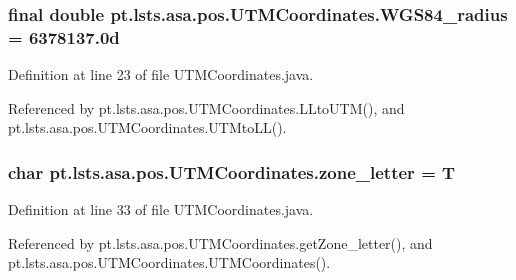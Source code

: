 \hypertarget{classpt_1_1lsts_1_1asa_1_1pos_1_1UTMCoordinates_a4831382346b13b053880be4b8fecb8db}{}
\subsubsection[{W\+G\+S84\+\_\+radius}]{\setlength{\rightskip}{0pt plus 5cm}final double pt.\+lsts.\+asa.\+pos.\+U\+T\+M\+Coordinates.\+W\+G\+S84\+\_\+radius = 6378137.\+0d\hspace{0.3cm}{\ttfamily [private]}}\label{classpt_1_1lsts_1_1asa_1_1pos_1_1UTMCoordinates_a4831382346b13b053880be4b8fecb8db}


Definition at line 23 of file U\+T\+M\+Coordinates.\+java.



Referenced by pt.\+lsts.\+asa.\+pos.\+U\+T\+M\+Coordinates.\+L\+Lto\+U\+T\+M(), and pt.\+lsts.\+asa.\+pos.\+U\+T\+M\+Coordinates.\+U\+T\+Mto\+L\+L().

\hypertarget{classpt_1_1lsts_1_1asa_1_1pos_1_1UTMCoordinates_a8677ce9f27943bc0beec8797559338a5}{}
\subsubsection[{zone\+\_\+letter}]{\setlength{\rightskip}{0pt plus 5cm}char pt.\+lsts.\+asa.\+pos.\+U\+T\+M\+Coordinates.\+zone\+\_\+letter = \textquotesingle{}T\textquotesingle{}\hspace{0.3cm}{\ttfamily [private]}}\label{classpt_1_1lsts_1_1asa_1_1pos_1_1UTMCoordinates_a8677ce9f27943bc0beec8797559338a5}


Definition at line 33 of file U\+T\+M\+Coordinates.\+java.



Referenced by pt.\+lsts.\+asa.\+pos.\+U\+T\+M\+Coordinates.\+get\+Zone\+\_\+letter(), and pt.\+lsts.\+asa.\+pos.\+U\+T\+M\+Coordinates.\+U\+T\+M\+Coordinates().

\hypertarget{classpt_1_1lsts_1_1asa_1_1pos_1_1UTMCoordinates_a90bf03e81ee88041f7831e0b6a6bc08c}{}
